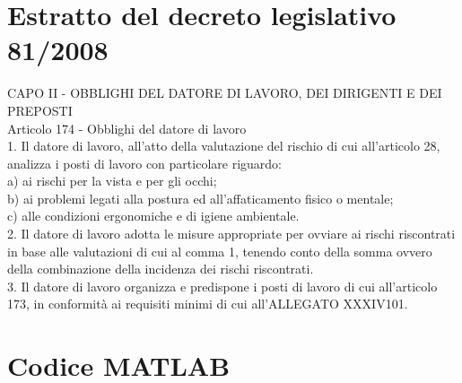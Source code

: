 \documentclass{article}
\begin{document}
\clearpage
\printbibliography

\newpage
\appendix
\section{Estratto del decreto legislativo 81/2008}

CAPO II - OBBLIGHI DEL DATORE DI LAVORO, DEI DIRIGENTI E DEI PREPOSTI\\
Articolo 174 - Obblighi del datore di lavoro\\
1. Il datore di lavoro, all’atto della valutazione del rischio di cui all’articolo 28, analizza i posti di lavoro con
particolare riguardo:\\
a) ai rischi per la vista e per gli occhi;\\
b) ai problemi legati alla postura ed all’affaticamento fisico o mentale;\\
c) alle condizioni ergonomiche e di igiene ambientale.\\
2. Il datore di lavoro adotta le misure appropriate per ovviare ai rischi riscontrati in base alle valutazioni di cui al
comma 1, tenendo conto della somma ovvero della combinazione della incidenza dei rischi riscontrati.\\
3. Il datore di lavoro organizza e predispone i posti di lavoro di cui all’articolo 173, in conformità ai requisiti minimi di
cui all’ALLEGATO XXXIV101.

\section{Codice MATLAB}
\end{document}
